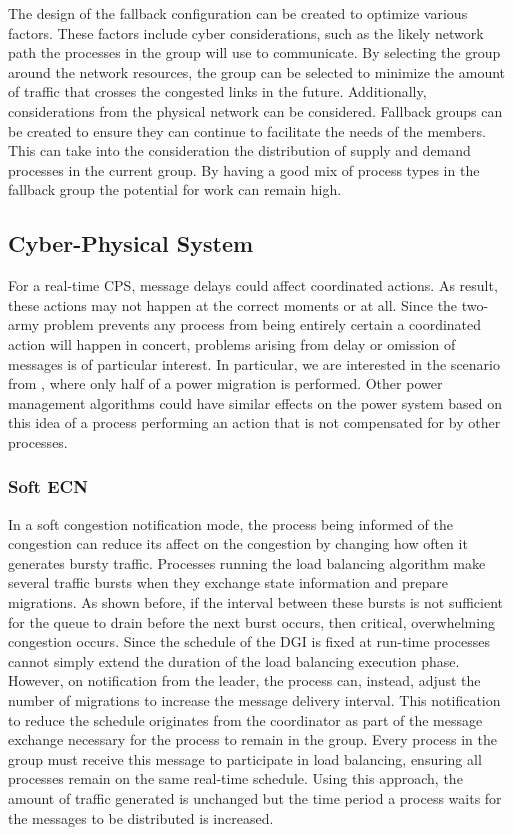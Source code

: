 The design of the fallback configuration can be created to optimize various factors.
These factors include cyber considerations, such as the likely network path the processes in the group will use to communicate.
By selecting the group around the network resources, the group can be selected to minimize the amount of traffic that crosses the congested links in the future.
Additionally, considerations from the physical network can be considered.
Fallback groups can be created to ensure they can continue to facilitate the needs of the members.
This can take into the consideration the distribution of supply and demand processes in the current group.
By having a good mix of process types in the fallback group the potential for work can remain high.

\subsection{Cyber-Physical System}

For a real-time \ac{CPS}, message delays could affect coordinated actions.
As result, these actions may not happen at the correct moments or at all.
Since the two-army problem prevents any process from being entirely certain a coordinated action will happen in concert, problems arising from delay or omission of messages is of particular interest.
In particular, we are interested in the scenario from \cite{HARINI}, where only half of a power migration is performed.
Other power management algorithms could have similar effects on the power system based on this idea of a process performing an action that is not compensated for by other processes.

\subsubsection{Soft \ac{ECN}}

In a soft congestion notification mode, the process being informed of the congestion can reduce its affect on the congestion by changing how often it generates bursty traffic.
Processes running the load balancing algorithm make several traffic bursts when they exchange state information and prepare migrations.
As shown before, if the interval between these bursts is not sufficient for the queue to drain before the next burst occurs, then critical, overwhelming congestion occurs.
Since the schedule of the \ac{DGI} is fixed at run-time processes cannot simply extend the duration of the load balancing execution phase.
However, on notification from the leader, the process can, instead, adjust the number of migrations to increase the message delivery interval.
This notification to reduce the schedule originates from the coordinator as part of the message exchange necessary for the process to remain in the group.
Every process in the group must receive this message to participate in load balancing, ensuring all processes remain on the same real-time schedule.
Using this approach, the amount of traffic generated is unchanged but the time period a process waits for the messages to be distributed is increased.

